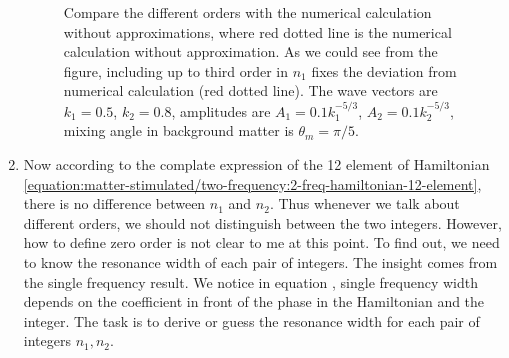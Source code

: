 \documentclass[letterpaper,12pt,english]{sphinxmanual}
\begin{document}
\begin{enumerate}
\begin{figure}[htbp]
\noindent{}
\caption{Compare the different orders with the numerical calculation without approximations, where red dotted line is the numerical calculation without approximation. As we could see from the figure, including up to third order in \(n_1\) fixes the deviation from numerical calculation (red dotted line). The wave vectors are \(k_1=0.5\), \(k_2=0.8\), amplitudes are \(A_1=0.1 k_1^{-5/3}\), \(A_2=0.1 k_2^{-5/3}\), mixing angle in background matter is \(\theta_m=\pi/5\).}\label{\detokenize{matter-stimulated/two-frequency:id3}}\end{figure}

\item {} 
Now according to the complate expression of the 12 element of Hamiltonian \eqref{equation:matter-stimulated/two-frequency:2-freq-hamiltonian-12-element}, there is no difference between \(n_1\) and \(n_2\). Thus whenever we talk about different orders, we should not distinguish between the two integers. However, how to define zero order is not clear to me at this point. To find out, we need to know the resonance width of each pair of integers. The insight comes from the single frequency result. We notice in equation {\hyperref[\detokenize{matter-stimulated/single-frequency:single-frequency-equation-eqn-single-frequency-width-guessing}]{}}, single frequency width depends on the coefficient in front of the phase in the Hamiltonian and the integer. The task is to derive or guess the resonance width for each pair of integers \(n_1, n_2\).

\end{enumerate}
\end{document}
